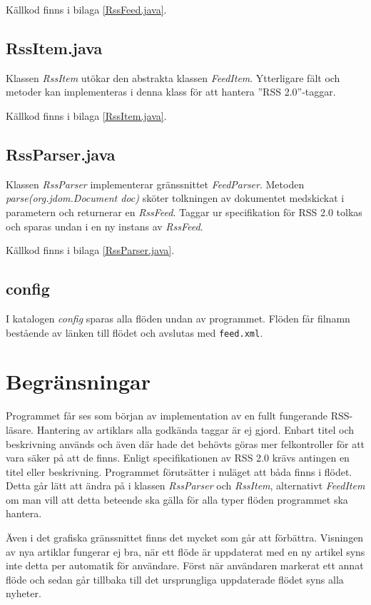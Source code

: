 \documentclass[a4paper, 12pt]{article}
\begin{document}
Källkod finns i bilaga \ref{RssFeed.java}.
\subsection{RssItem.java}\label{RssItem}
Klassen \textit{RssItem} utökar den abstrakta klassen
\textit{FeedItem}. Ytterligare fält och metoder kan implementeras i
denna klass för att hantera ''RSS 2.0''-taggar.

Källkod finns i bilaga \ref{RssItem.java}.
\subsection{RssParser.java}\label{RssParser}
Klassen \textit{RssParser} implementerar gränssnittet
\textit{FeedParser}. Metoden \textit{parse(org.jdom.Document doc)}
sköter tolkningen av dokumentet medskickat i parametern och returnerar
en \textit{RssFeed}. Taggar ur specifikation för RSS 2.0 tolkas och
sparas undan i en ny instans av \textit{RssFeed}.

Källkod finns i bilaga \ref{RssParser.java}.
\subsection{config}
I katalogen \textit{config} sparas alla flöden undan av
programmet. Flöden får filnamn bestående av länken till flödet och
avslutas med \verb!feed.xml!.

\section{Begränsningar}\label{Begransningar}

Programmet får ses som början av implementation av en fullt fungerande
RSS-läsare. Hantering av artiklars alla godkända taggar är ej
gjord. Enbart titel och beskrivning används och även där hade det
behövts göras mer felkontroller för att vara säker på att de
finns. Enligt specifikationen av RSS 2.0 krävs antingen en titel eller
beskrivning. Programmet förutsätter i nuläget att båda finns i
flödet. Detta går lätt att ändra på i klassen \textit{RssParser} och
\textit{RssItem}, alternativt \textit{FeedItem} om man vill att detta
beteende ska gälla för alla typer flöden programmet ska hantera.

Även i det grafiska gränssnittet finns det mycket som går att
förbättra. Visningen av nya artiklar fungerar ej bra, när ett flöde är
uppdaterat med en ny artikel syns inte detta per automatik för
användare. Först när användaren markerat ett annat flöde och sedan går
tillbaka till det ursprungliga uppdaterade flödet syns alla nyheter.
\end{document}
